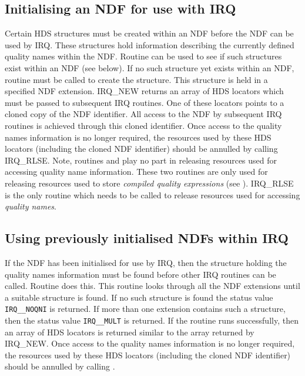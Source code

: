 \documentclass[twoside,11pt,nolof]{starlink}
\begin{document}
\subsection{Initialising an NDF for use with IRQ}

Certain HDS structures must be created within an NDF before the NDF can
be used by IRQ. These structures hold information describing the
currently defined quality names within the NDF. Routine
 can be used to see if such structures exist
within an NDF (see below). If no such structure yet exists within an NDF,
routine  must be called to create the
structure. This structure is held in a specified NDF extension. IRQ\_NEW
returns an array of HDS locators which must be passed to subsequent IRQ
routines. One of these locators points to a cloned copy of the NDF
identifier. All access to the NDF by subsequent IRQ routines is achieved
through this cloned identifier. Once access to the quality names
information is no longer required, the resources used by these HDS
locators (including the cloned NDF identifier) should be annulled by
calling IRQ\_RLSE. Note, routines  and
 play no part in releasing resources used
for accessing quality name information. These two routines are only used
for releasing resources used to store \emph{compiled quality expressions}
(see ). IRQ\_RLSE is the only routine which needs
to be called to release resources used for accessing \emph{quality names}.


\subsection{Using previously initialised NDFs within IRQ}

If the NDF has been initialised for use by IRQ, then the structure
holding the quality names information must be found before other IRQ
routines can be called. Routine  does this.
This routine looks through all the NDF extensions until a suitable
structure is found. If no such structure is found the status value
\texttt{IRQ\_\_NOQNI} is returned. If more than one extension contains such a
structure, then the status value \texttt{IRQ\_\_MULT} is returned. If the routine
runs successfully, then an array of HDS locators is returned similar to
the array returned by IRQ\_NEW. Once access to the quality names
information is no longer required, the resources used by these HDS
locators (including the cloned NDF identifier) should be annulled by
calling .
\end{document}
